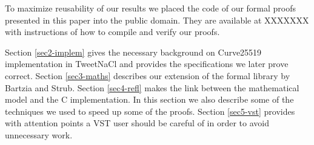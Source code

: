 To maximize reusability of our results we placed the code of our formal proofs
presented in this paper into the public domain. They are available at XXXXXXX
with instructions of how to compile and verify our proofs.

Section \ref{sec2-implem} gives the necessary background on Curve25519
implementation in TweetNaCl and provides the specifications we later prove correct.
Section \ref{sec3-maths} describes our extension of the formal library by Bartzia and Strub.
Section \ref{sec4-refl} makes the link between the mathematical model and the C implementation.
In this section we also describe some of the techniques we used to speed up some of the proofs.
Section \ref{sec5-vst} provides with attention points a VST user should be careful
of in order to avoid unnecessary work.



%
%
